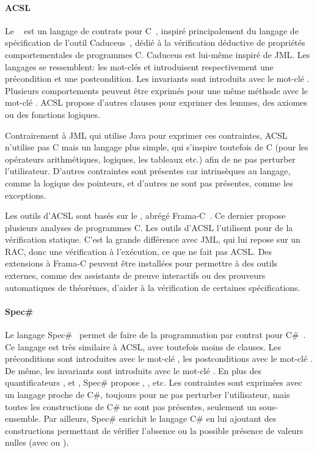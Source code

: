 \paragraph{ACSL} Le ~
est un langage de contrats pour C~, inspiré principalement du langage
de spécification de l'outil Caduceus~, dédié à la
vérification déductive de propriétés comportementales de programmes C. Caduceus
est lui-même inspiré de JML. Les langages se ressemblent: les mot-clés
 et  introduisent respectivement une précondition
et une postcondition. Les invariants sont introduits avec le mot-clé
. Plusieurs comportements peuvent être exprimés pour une même
méthode avec le mot-clé . ACSL propose d'autres clauses pour
exprimer des lemmes, des axiomes ou des fonctions logiques.

Contrairement à JML qui utilise Java pour exprimer ces contraintes, ACSL
n'utilise pas C mais un langage plus simple, qui s'inspire toutefois de C (pour
les opérateurs arithmétiques, logiques, les tableaux etc.) afin de ne pas
perturber l'utilisateur. D'autres contraintes sont présentes car intrinsèques au
langage, comme la logique des pointeurs, et d'autres ne sont pas présentes,
comme les exceptions.

Les outils d'ACSL sont basés sur le , abrégé Frama-C~. Ce dernier propose plusieurs analyses de
programmes C. Les outils d'ACSL l'utilisent pour de la vérification statique.
C'est la grande différence avec JML, qui lui repose sur un RAC, donc une
vérification à l'exécution, ce que ne fait pas ACSL. Des extensions à Frama-C
peuvent être installées pour permettre à des outils externes, comme des
assistants de preuve interactifs ou des prouveurs automatiques de théorèmes,
d'aider à la vérification de certaines spécifications.

\paragraph{Spec\#} Le langage Spec\#~ permet de faire de la
programmation par contrat pour C\#~. Ce langage est très similaire
à ACSL, avec toutefois moins de clauses. Les préconditions sont introduites avec
le mot-clé , les postconditions avec le mot-clé .
De même, les invariants sont introduits avec le mot-clé . En
plus des quantificateurs ,  et ,
Spec\# propose , ,  etc. Les contraintes sont
exprimées avec un langage proche de C\#, toujours pour ne pas perturber
l'utilisateur, mais toutes les constructions de C\# ne sont pas présentes,
seulement un sous-ensemble.  Par ailleurs, Spec\# enrichit le langage C\# en lui
ajoutant des constructions permettant de vérifier l'absence ou la possible
présence de valeurs nulles (avec \code{!} ou ).

